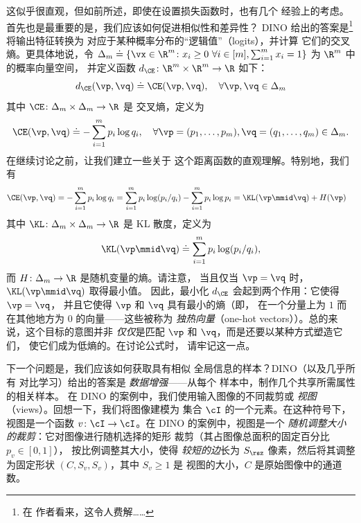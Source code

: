 \documentclass[../../book-main_zh.tex]{subfiles}
\begin{document}
这似乎很直观，但如前所述，即使在设置损失函数时，也有几个
经验上的考虑。首先也是最重要的是，我们应该如何促进相似性和差异性？
DINO \citep{caron2021emerging} 给出的答案是\footnote{在
作者看来，这令人费解……}将输出特征转换为
对应于某种概率分布的“逻辑值”（logits），并计算
它们的交叉熵。更具体地说，令 \(\Delta_{m} \doteq \{\vx
        \in \R^{m} \colon x_{i} \geq 0\ \forall i \in [m], \sum_{i =
1}^{m}x_{i} = 1\}\) 为 \(\R^{m}\) 中的概率向量空间，
并定义函数 \(d_{\CE} \colon \R^{m} \times \R^{m} \to \R\) 如下：
\begin{equation}\label{eq:cross_entropy_difference}
    d_{\CE}(\vp, \vq) \doteq \CE(\vp, \vq), \quad \forall \vp, \vq
    \in \Delta_{m}
\end{equation}
其中 \(\CE \colon \Delta_{m} \times \Delta_{m} \to \R\) 是
交叉熵，定义为
\begin{equation}\label{eq:expts_def_ce}
    \CE(\vp, \vq) \doteq -\sum_{i = 1}^{m}p_{i}\log q_{i}, \quad
    \forall \vp = (p_{1}, \dots, p_{m}), \vq = (q_{1}, \dots, q_{m})
    \in \Delta_{m}.
\end{equation}
在继续讨论之前，让我们建立一些关于
这个距离函数的直观理解。特别地，我们有
\begin{align}
    \CE(\vp, \vq)
    &= -\sum_{i = 1}^{m}p_{i}\log q_{i} = \sum_{i = 1}^{m}p_{i}\log(p_{i}/q_{i})
    - \sum_{i = 1}^{m}p_{i}\log p_{i} = \KL(\vp\mmid \vq) + H(\vp)
\end{align}
其中 \(\KL \colon \Delta_{m} \times \Delta_{m} \to \R\) 是 KL
散度，定义为
\begin{equation}
    \KL(\vp\mmid \vq) \doteq \sum_{i = 1}^{m}p_{i}\log(p_{i}/q_{i}),
\end{equation}
而 \(H \colon \Delta_{m} \to \R\) 是随机变量的熵。请注意，
当且仅当 \(\vp = \vq\) 时，\(\KL(\vp\mmid \vq)\) 取得最小值。
因此，最小化 \(d_{\CE}\) 会起到两个作用：它使得 \(\vp = \vq\)，
并且它使得 \(\vp\) 和 \(\vq\) 具有最小的熵（即，
    在一个分量上为 \(1\) 而在其他地方为 \(0\) 的向量——这些被称为
\textit{独热向量}（one-hot vectors））。总的来说，这个目标的意图并非
\textit{仅仅}是匹配 \(\vp\) 和 \(\vq\)，而是还要以某种方式塑造它们，
使它们成为低熵的。在讨论公式时，
请牢记这一点。

下一个问题是，我们应该如何获取具有相似
全局信息的样本？DINO（以及几乎所有
对比学习）给出的答案是 \textit{数据增强}——从每个
样本中，制作几个共享所需属性的相关样本。
在 DINO 的案例中，我们使用输入图像的不同裁剪或
\textit{视图}（views）。回想一下，我们将图像建模为
集合 \(\cI\) 的一个元素。在这种符号下，视图是一个函数
\(v \colon \cI \to \cI\)。在 DINO 的案例中，视图是一个
\textit{随机调整大小的裁剪}：它对图像进行随机选择的矩形
裁剪（其占图像总面积的固定百分比 \(p_{v} \in [0, 1]\)），
按比例调整其大小，使得
\textit{较短的边}长为 \(S_{\rsz}\) 像素，然后将其调整
为固定形状 \((C, S_{v}, S_{v})\)，其中 \(S_{v} \geq 1\) 是
视图的大小，\(C\) 是原始图像中的通道数。
\end{document}

